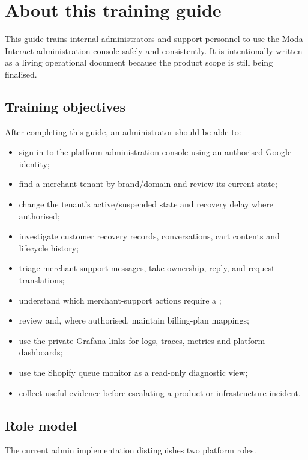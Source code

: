 \chapter{About this training guide}

This guide trains internal administrators and support personnel to use the Moda Interact administration console safely and consistently. It is intentionally written as a living operational document because the product scope is still being finalised.


\section{Training objectives}
After completing this guide, an administrator should be able to:
\begin{itemize}
  \item sign in to the platform administration console using an authorised Google identity;
  \item find a merchant tenant by brand/domain and review its current state;
  \item change the tenant's active/suspended state and recovery delay where authorised;
  \item investigate customer recovery records, conversations, cart contents and lifecycle history;
  \item triage merchant support messages, take ownership, reply, and request translations;
  \item understand which merchant-support actions require a ;
  \item review and, where authorised, maintain billing-plan mappings;
  \item use the private Grafana links for logs, traces, metrics and platform dashboards;
  \item use the Shopify queue monitor as a read-only diagnostic view;
  \item collect useful evidence before escalating a product or infrastructure incident.
\end{itemize}

\section{Role model}
The current admin implementation distinguishes two platform roles.

